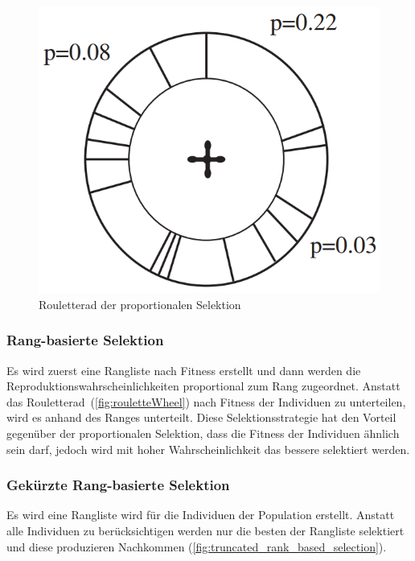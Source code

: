         \begin{figure}[H]
          \includegraphics[scale=0.4,center]{graphics/roulettewheel}
          \caption[\protect{}, S.24]{Rouletterad der proportionalen Selektion\label{fig:rouletteWheel}}
        \end{figure}

      \subsubsection{Rang-basierte Selektion}

        Es wird zuerst eine Rangliste nach Fitness erstellt und dann werden die Reproduktionswahrscheinlichkeiten proportional zum Rang zugeordnet.
        Anstatt das Rouletterad~(\vref{fig:rouletteWheel}) nach Fitness der Individuen zu unterteilen,
        wird es anhand des Ranges unterteilt.
        Diese Selektionsstrategie hat den Vorteil gegenüber der proportionalen Selektion,
        dass die Fitness der Individuen ähnlich sein darf,
        jedoch wird mit hoher Wahrscheinlichkeit das bessere selektiert werden.

      \subsubsection{Gekürzte Rang-basierte Selektion}

        Es wird eine Rangliste wird für die Individuen der Population erstellt.
        Anstatt alle Individuen zu berücksichtigen werden nur die besten der Rangliste selektiert und diese produzieren Nachkommen (\vref{fig:truncated_rank_based_selection}).

